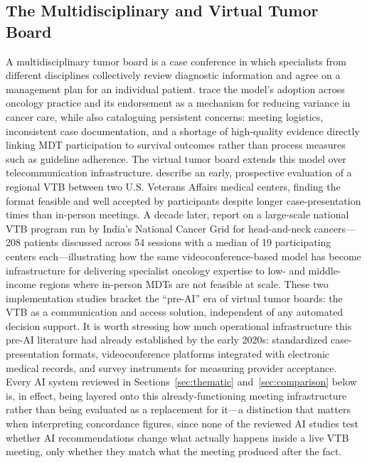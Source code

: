 \documentclass[acmsmall,screen=true,review=false,nonacm=true]{acmart}
\begin{document}
\subsection{The Multidisciplinary and Virtual Tumor Board}
\label{sec:mdt-vtb}

A multidisciplinary tumor board is a case conference in which specialists from different disciplines collectively review diagnostic information and agree on a management plan for an individual patient. \citet{patkar2011} trace the model's adoption across oncology practice and its endorsement as a mechanism for reducing variance in cancer care, while also cataloguing persistent concerns: meeting logistics, inconsistent case documentation, and a shortage of high-quality evidence directly linking MDT participation to survival outcomes rather than process measures such as guideline adherence. The virtual tumor board extends this model over telecommunication infrastructure. \citet{marshall2014} describe an early, prospective evaluation of a regional VTB between two U.S. Veterans Affairs medical centers, finding the format feasible and well accepted by participants despite longer case-presentation times than in-person meetings. A decade later, \citet{thiagarajan2023} report on a large-scale national VTB program run by India's National Cancer Grid for head-and-neck cancers---208 patients discussed across 54 sessions with a median of 19 participating centers each---illustrating how the same videoconference-based model has become infrastructure for delivering specialist oncology expertise to low- and middle-income regions where in-person MDTs are not feasible at scale. These two implementation studies bracket the ``pre-AI'' era of virtual tumor boards: the VTB as a communication and access solution, independent of any automated decision support. It is worth stressing how much operational infrastructure this pre-AI literature had already established by the early 2020s: standardized case-presentation formats, videoconference platforms integrated with electronic medical records, and survey instruments for measuring provider acceptance. Every AI system reviewed in Sections~\ref{sec:thematic} and~\ref{sec:comparison} below is, in effect, being layered onto this already-functioning meeting infrastructure rather than being evaluated as a replacement for it---a distinction that matters when interpreting concordance figures, since none of the reviewed AI studies test whether AI recommendations change what actually happens inside a live VTB meeting, only whether they match what the meeting produced after the fact.
\end{document}
